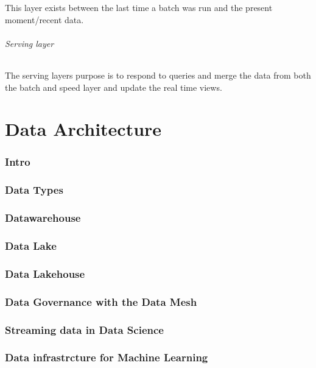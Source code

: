 \documentclass[a4paper, 11pt]{book}
\begin{document}
    This layer exists between the last time a batch was run and the present moment/recent data.

    \paragraph{Serving layer}
    The serving layers purpose is to respond to queries and merge the data from both the batch and speed layer and update the real time views.


    \part{Data Architecture}


    \section{Intro}


    \section{Data Types}


    \section{Datawarehouse}


    \section{Data Lake}


    \section{Data Lakehouse}


    \section{Data Governance with the Data Mesh}


    \section{Streaming data in Data Science}


    \section{Data infrastrcture for Machine Learning}
\end{document}
